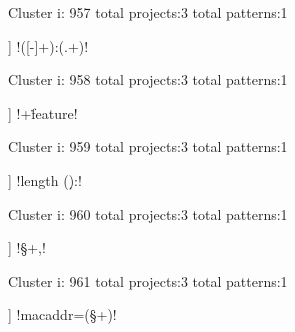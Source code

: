 Cluster i: 957
total projects:3
total patterns:1
\begin{multicols}{1}
\begin{description}[noitemsep,topsep=0pt]
\item [[3] ] \cverb!([\w-]+):(.+)!
\end{description}
\end{multicols}







Cluster i: 958
total projects:3
total patterns:1
\begin{multicols}{1}
\begin{description}[noitemsep,topsep=0pt]
\item [[3] ] \cverb!\w+\.feature!
\end{description}
\end{multicols}







Cluster i: 959
total projects:3
total patterns:1
\begin{multicols}{1}
\begin{description}[noitemsep,topsep=0pt]
\item [[3] ] \cverb!length (\d*):!
\end{description}
\end{multicols}







Cluster i: 960
total projects:3
total patterns:1
\begin{multicols}{1}
\begin{description}[noitemsep,topsep=0pt]
\item [[3] ] \cverb!\A\s\s\S+,!
\end{description}
\end{multicols}







Cluster i: 961
total projects:3
total patterns:1
\begin{multicols}{1}
\begin{description}[noitemsep,topsep=0pt]
\item [[3] ] \cverb!macaddr=(\S+)!
\end{description}
\end{multicols}







